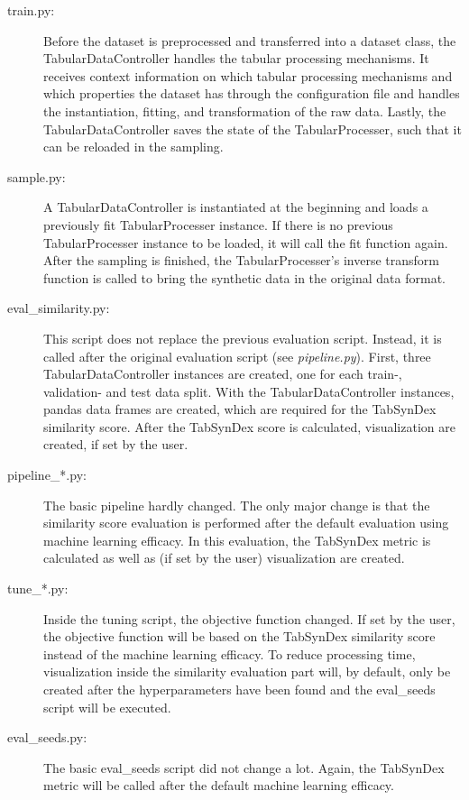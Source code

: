 \begin{description}
    \item[train.py:]
    Before the dataset is preprocessed and transferred into a dataset class, the TabularDataController handles the tabular processing mechanisms.
	It receives context information on which tabular processing mechanisms and which properties the dataset has through the configuration file and handles the
	instantiation, fitting, and transformation of the raw data.
	Lastly, the TabularDataController saves the state of the TabularProcesser, such that it can be reloaded in the sampling.

    \item[sample.py:]
	A TabularDataController is instantiated at the beginning and loads a previously fit TabularProcesser instance.
	If there is no previous TabularProcesser instance to be loaded, it will call the fit function again.
	After the sampling is finished, the TabularProcesser's inverse transform function is called to bring the synthetic data in the original data format.  

    \item[eval\_similarity.py:]
	This script does not replace the previous evaluation script. 
	Instead, it is called after the original evaluation script (see \textit{pipeline.py}).
	First, three TabularDataController instances are created, one for each train-, validation- and test data split.
	With the TabularDataController instances, pandas \cite{mckinney-proc-scipy-2010} data frames are created, which are required for the TabSynDex similarity score.
	After the TabSynDex score is calculated, visualization are created, if set by the user.

    \item[pipeline\_*.py:]
	The basic pipeline hardly changed. 
	The only major change is that the similarity score evaluation is performed after the default evaluation using machine learning efficacy.
	In this evaluation, the TabSynDex metric is calculated as well as (if set by the user) visualization are created.
    
    \item[tune\_*.py:]
    Inside the tuning script, the objective function changed.
	If set by the user, the objective function will be based on the TabSynDex similarity score instead of the machine learning efficacy.
	To reduce processing time, visualization inside the similarity evaluation part will, by default, only be created after the hyperparameters have been found and the eval\_seeds script will be executed.

	\item[eval\_seeds.py:]
	The basic eval\_seeds script did not change a lot.
	Again, the TabSynDex metric will be called after the default machine learning efficacy. 
\end{description}

